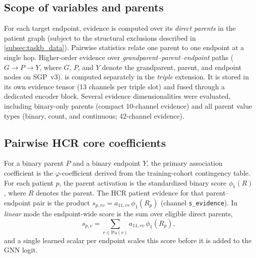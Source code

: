 \subsection{Scope of variables and parents}
For each target endpoint, evidence is computed over its \emph{direct parents}
in the patient graph (subject to the structural exclusions described in
\cref{subsec:taskb_data}).
Pairwise statistics relate one parent to one endpoint at a single hop.
Higher-order evidence over \emph{grandparent--parent--endpoint} paths
(\(G \rightarrow P \rightarrow Y\), where \(G\), \(P\), and \(Y\) denote the
grandparent, parent, and endpoint nodes on SGP~v3).
is computed separately in the \emph{triple} extension.
It is stored in its own evidence tensor (13 channels per triple slot) and fused
through a dedicated encoder block.
Several evidence dimensionalities were evaluated, including binary-only
parents (compact 10-channel evidence) and all parent value types (binary,
count, and continuous; 42-channel evidence).

\subsection{Pairwise HCR core coefficients}
For a binary parent \(P\) and a binary endpoint \(Y\), the primary association
coefficient is the \(\varphi\)-coefficient
derived from the training-cohort contingency table.
For each patient \(p\), the parent activation is the standardized binary score
\(\phi_1(R)\), where \(R\) denotes the parent.
The HCR patient evidence for that parent--endpoint pair is the product
\(s_{p,rv} = a_{11,rv}\,\phi_1(R_p)\) (channel \texttt{s\_evidence}).
In \emph{linear} mode the endpoint-wide score is the sum over eligible direct
parents,
\[
  s_{p,v} = \sum_{r \in \mathrm{Pa}(v)} a_{11,rv}\,\phi_1(R_p),
\]
and a single learned scalar per endpoint scales this score before it is
added to the GNN logit. 

